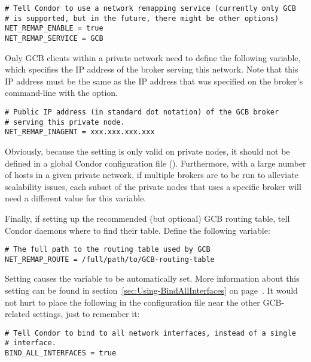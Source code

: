 \footnotesize
\begin{verbatim}
# Tell Condor to use a network remapping service (currently only GCB
# is supported, but in the future, there might be other options)
NET_REMAP_ENABLE = true
NET_REMAP_SERVICE = GCB
\end{verbatim}
\normalsize

Only GCB clients within a private network need to define the following
variable, which specifies the IP address of the broker serving this
network.
Note that this IP address must be the same as the IP address
that was specified on the
broker's command-line with the  option.

\footnotesize
\begin{verbatim}
# Public IP address (in standard dot notation) of the GCB broker
# serving this private node.
NET_REMAP_INAGENT = xxx.xxx.xxx.xxx
\end{verbatim}
\normalsize

Obviously, because the  setting is only
valid on private nodes, it should not be defined in a global
Condor configuration file ().
Furthermore, with a large number of hosts in a given private
network, if multiple brokers are to be run to alleviate
scalability issues, each subset of the private nodes that uses a
specific broker will need a different value for this variable.

Finally, if setting up  the recommended (but optional) GCB routing table, 
tell Condor daemons where to find their table.
Define the following variable:

\footnotesize
\begin{verbatim}
# The full path to the routing table used by GCB
NET_REMAP_ROUTE = /full/path/to/GCB-routing-table
\end{verbatim}
\normalsize

Setting  causes the
 variable to be automatically set.
More information about this setting can be found in
section~\ref{sec:Using-BindAllInterfaces} on
page~\pageref{sec:Using-BindAllInterfaces}.
It would not hurt to place the following in the
configuration file near the other GCB-related settings,
just to remember it:

\footnotesize
\begin{verbatim}
# Tell Condor to bind to all network interfaces, instead of a single
# interface.
BIND_ALL_INTERFACES = true
\end{verbatim}
\normalsize

